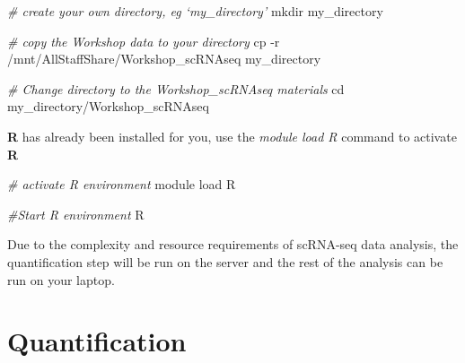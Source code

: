 \documentclass[
  openany]{book}
\newenvironment{Shaded}{\begin{snugshade}}{\end{snugshade}}
\newcommand{\AttributeTok}[1]{\textcolor[rgb]{0.77,0.63,0.00}{#1}}
\newcommand{\BuiltInTok}[1]{#1}
\newcommand{\CommentTok}[1]{\textcolor[rgb]{0.56,0.35,0.01}{\textit{#1}}}
\newcommand{\ExtensionTok}[1]{#1}
\newcommand{\FunctionTok}[1]{\textcolor[rgb]{0.00,0.00,0.00}{#1}}
\newcommand{\NormalTok}[1]{#1}
\begin{document}
\begin{Shaded}
\begin{Highlighting}[]
\CommentTok{\# create your own directory, eg ‘my\_directory’}
\FunctionTok{mkdir}\NormalTok{ my\_directory}
\end{Highlighting}
\end{Shaded}

\begin{Shaded}
\begin{Highlighting}[]
\CommentTok{\# copy the Workshop data to your directory}
\FunctionTok{cp} \AttributeTok{{-}r}\NormalTok{ /mnt/AllStaffShare/Workshop\_scRNAseq my\_directory}
\end{Highlighting}
\end{Shaded}

\begin{Shaded}
\begin{Highlighting}[]
\CommentTok{\# Change directory to the Workshop\_scRNAseq materials}
\BuiltInTok{cd}\NormalTok{ my\_directory/Workshop\_scRNAseq}
\end{Highlighting}
\end{Shaded}

\textbf{R} has already been installed for you, use the \emph{module load R} command to activate \textbf{R}

\begin{Shaded}
\begin{Highlighting}[]
\CommentTok{\# activate R environment}
\ExtensionTok{module}\NormalTok{ load R}
\end{Highlighting}
\end{Shaded}

\begin{Shaded}
\begin{Highlighting}[]
\CommentTok{\#Start R environment}
\ExtensionTok{R}
\end{Highlighting}
\end{Shaded}

Due to the complexity and resource requirements of scRNA-seq data analysis, the quantification step will be run on the server and the rest of the analysis can be run on your laptop.
\vspace{-100pt}

\vspace{-100pt}

\hypertarget{quantification-1}{%
\chapter{Quantification}\label{quantification-1}}
\end{document}
